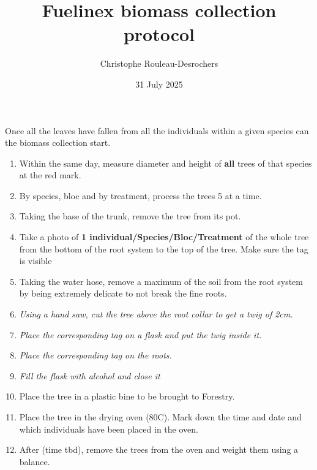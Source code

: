 \documentclass{article}
\title{Fuelinex biomass collection protocol}
\author[1*$\dag$]{Christophe Rouleau-Desrochers}
\affil[1]{UBC}
\date{31 July 2025}
\begin{document}
\maketitle

Once all the leaves have fallen from all the individuals within a given species can the biomass collection start. 
\begin{enumerate}
	\item Within the same day, measure diameter and height of \textbf{all} trees of that species at the red mark.
	\item By species, bloc and by treatment, process the trees 5 at a time.
	\item Taking the base of the trunk, remove the tree from its pot. 
	\item Take a photo of \textbf{1 individual/Species/Bloc/Treatment} of the whole tree from the bottom of the root system to the top of the tree. Make sure the tag is visible
	\item Taking the water hose, remove a maximum of the soil from the root system by being extremely delicate to not break the fine roots. 
	\item \textit{Using a hand saw, cut the tree above the root collar to get a twig of 2cm. }
	\item \textit{Place the corresponding tag on a flask and put the twig inside it. }
	\item \textit{Place the corresponding tag on the roots.}
	\item \textit{Fill the flask with alcohol and close it}
	\item Place the tree in a plastic bine to be brought to Forestry.
	\item Place the tree in the drying oven (80C). Mark down the time and date and which individuals have been placed in the oven. 
	\item After (time tbd), remove the trees from the oven and weight them using a balance. 
\end{enumerate}
\end{document}
